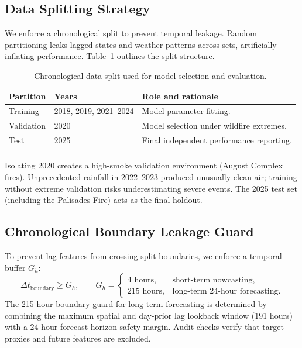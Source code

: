 \documentclass[pdflatex,sn-mathphys-num]{sn-jnl}
\begin{document}
\subsection{Data Splitting Strategy}\label{subsec:data-split}
We enforce a chronological split to prevent temporal leakage. Random partitioning leaks lagged states and weather patterns across sets, artificially inflating performance. Table~\ref{tab:data-split} outlines the split structure.

\begin{table}[htbp]
\caption{Chronological data split used for model selection and evaluation.}\label{tab:data-split}
\begin{tabular*}{\textwidth}{@{\extracolsep\fill}lll}
\toprule
Partition & Years & Role and rationale \\
\midrule
Training & 2018, 2019, 2021--2024 & Model parameter fitting. \\
Validation & 2020 & Model selection under wildfire extremes. \\
Test & 2025 & Final independent performance reporting. \\
\botrule
\end{tabular*}
\end{table}

Isolating 2020 creates a high-smoke validation environment (August Complex fires). Unprecedented rainfall in 2022--2023 produced unusually clean air; training without extreme validation risks underestimating severe events. The 2025 test set (including the Palisades Fire) acts as the final holdout.

\subsection{Chronological Boundary Leakage Guard}\label{subsec:leakage-guard}
To prevent lag features from crossing split boundaries, we enforce a temporal buffer $G_h$:
\begin{equation}
    \Delta t_{\mathrm{boundary}} \geq G_h,
    \qquad
    G_h =
    \begin{cases}
    4 \text{ hours}, & \text{short-term nowcasting},\\
    215 \text{ hours}, & \text{long-term 24-hour forecasting}.
    \end{cases}
    \label{eq:boundary-guard}
\end{equation}
The 215-hour boundary guard for long-term forecasting is determined by combining the maximum spatial and day-prior lag lookback window (191 hours) with a 24-hour forecast horizon safety margin. Audit checks verify that target proxies and future features are excluded.
\end{document}
